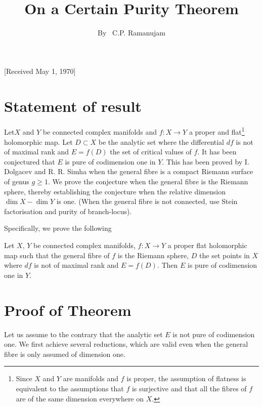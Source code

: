 \title{On a Certain Purity Theorem}\label{art7}

\author{By~ C.P. Ramanujam}

\date{}
\maketitle

\begin{center}
[Received May 1, 1970]
\end{center}

\setcounter{page}{87}

\section{Statement of result}\label{art7-sec1}
\setcounter{pageoriginal}{64}
 Let\pageoriginale $X$ and $Y$ be connected complex manifolds and $f: X \to Y$ a proper and flat\footnote{Since $X$ and $Y$ are manifolds and $f$ is proper, the assumption of flatness is equivalent to the assumptions that $f$ is surjective and that all the fibres of $f$ are of the same dimension everywhere on $X$.} holomorphic map. Let $D \subset X$ be the analytic set where the differential $df$ is not of maximal rank and $E = f(D)$ the set of critical values of $f$. It has been conjectured that $E$ is pure of codimension one in $Y$. This has been proved by I. Dolgacev \cite{art7-key1} and R. R. Simha \cite{art7-key2} when the general fibre is a compact Riemann surface of genus $g \ge 1$. We prove the conjecture when the general fibre is the Riemann sphere, thereby establishing the conjecture when the relative dimension $\dim X - \dim Y$ is one. (When the general fibre is not connected, use Stein factorisation and purity of branch-locus).

Specifically, we prove the following 

\begin{theorem*}
Let $X$, $Y$ be connected complex manifolds, $f: X \to Y$ a proper flat holomorphic map such that the general fibre of $f$ is the Riemann sphere, $D$ the set points in $X$ where $df$ is not of maximal rank and $E = f(D)$. Then $E$ is pure of codimension one in $Y$.
\end{theorem*}

\section{Proof of Theorem}\label{art7-sec2}
Let us assume to the contrary that the analytic set $E$ is not pure of codimension one. We first achieve several reductions, which are valid even when the general fibre is only assumed of dimension one. 

